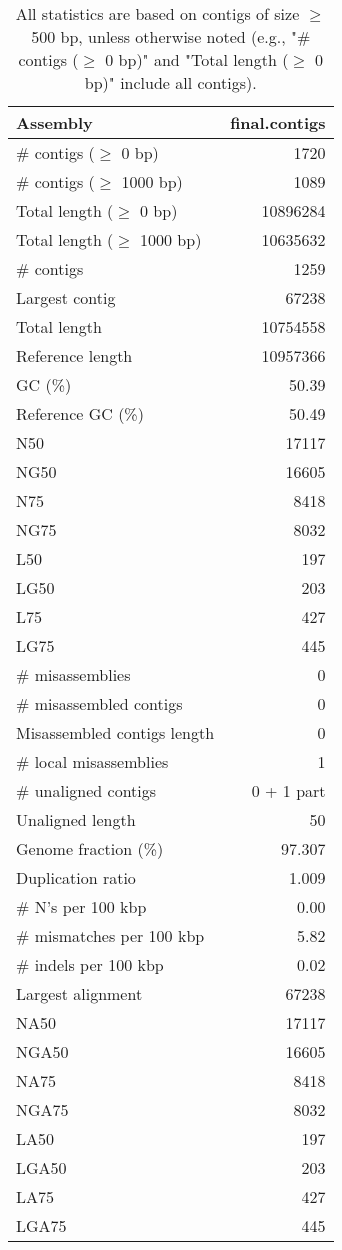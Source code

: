 \documentclass[12pt,a4paper]{article}
\begin{document}
\begin{table}[ht]
\begin{center}
\caption{All statistics are based on contigs of size $\geq$ 500 bp, unless otherwise noted (e.g., "\# contigs ($\geq$ 0 bp)" and "Total length ($\geq$ 0 bp)" include all contigs).}
\begin{tabular}{|l*{1}{|r}|}
\hline
Assembly & final.contigs \\ \hline
\# contigs ($\geq$ 0 bp) & 1720 \\ \hline
\# contigs ($\geq$ 1000 bp) & 1089 \\ \hline
Total length ($\geq$ 0 bp) & 10896284 \\ \hline
Total length ($\geq$ 1000 bp) & 10635632 \\ \hline
\# contigs & 1259 \\ \hline
Largest contig & 67238 \\ \hline
Total length & 10754558 \\ \hline
Reference length & 10957366 \\ \hline
GC (\%) & 50.39 \\ \hline
Reference GC (\%) & 50.49 \\ \hline
N50 & 17117 \\ \hline
NG50 & 16605 \\ \hline
N75 & 8418 \\ \hline
NG75 & 8032 \\ \hline
L50 & 197 \\ \hline
LG50 & 203 \\ \hline
L75 & 427 \\ \hline
LG75 & 445 \\ \hline
\# misassemblies & 0 \\ \hline
\# misassembled contigs & 0 \\ \hline
Misassembled contigs length & 0 \\ \hline
\# local misassemblies & 1 \\ \hline
\# unaligned contigs & 0 + 1 part \\ \hline
Unaligned length & 50 \\ \hline
Genome fraction (\%) & 97.307 \\ \hline
Duplication ratio & 1.009 \\ \hline
\# N's per 100 kbp & 0.00 \\ \hline
\# mismatches per 100 kbp & 5.82 \\ \hline
\# indels per 100 kbp & 0.02 \\ \hline
Largest alignment & 67238 \\ \hline
NA50 & 17117 \\ \hline
NGA50 & 16605 \\ \hline
NA75 & 8418 \\ \hline
NGA75 & 8032 \\ \hline
LA50 & 197 \\ \hline
LGA50 & 203 \\ \hline
LA75 & 427 \\ \hline
LGA75 & 445 \\ \hline
\end{tabular}
\end{center}
\end{table}
\end{document}
